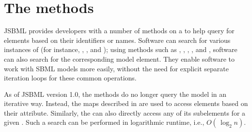 
\section{The  methods}
\label{sec:find-methods}

JSBML provides developers with a number of  methods
%
on a \Model to help query for elements based on their identifiers or
names. Software can search for various instances of  (for
instance, \CallableSBase, \NamedSBase, and \NamedSBaseWithDerivedUnit);
using methods such as , ,
, , and ,
software can also search for the corresponding model element.  They enable
software to work with SBML models more easily, without the need for
explicit separate iteration loops for these common operations.

As of JSBML version 1.0, the  methods do no longer query the
model in an iterative way. Instead, the maps described in
 are used to access elements based on their 
attribute. Similarly, the \SBMLDocument can also directly access any of its
subelements for a given . Such a search can be performed in
logarithmic runtime, i.e., $O(\,\log_2 n)$.

